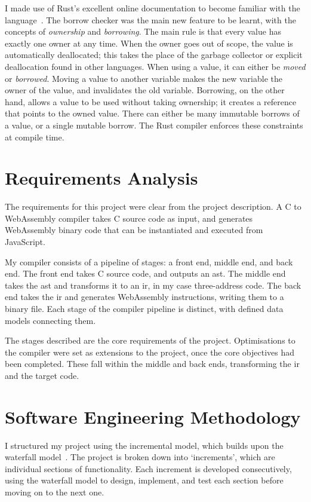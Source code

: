 \documentclass[00-main.tex]{subfiles}
\begin{document}
I made use of Rust's excellent online documentation to become familiar with the language~.
The borrow checker was the main new feature to be learnt, with the concepts of \emph{ownership} and \emph{borrowing}.
The main rule is that every value has exactly one owner at any time.
When the owner goes out of scope, the value is automatically deallocated; this takes the place of the garbage collector or explicit deallocation found in other languages.
When using a value, it can either be \emph{moved} or \emph{borrowed}.
Moving a value to another variable makes the new variable the owner of the value, and invalidates the old variable.
Borrowing, on the other hand, allows a value to be used without taking ownership; it creates a reference that points to the owned value.
There can either be many immutable borrows of a value, or a single mutable borrow.
The Rust compiler enforces these constraints at compile time.

\section{Requirements Analysis}

The requirements for this project were clear from the project description.
A C to WebAssembly compiler takes C source code as input, and generates WebAssembly binary code that can be instantiated and executed from JavaScript.

My compiler consists of a pipeline of stages: a front end, middle end, and back end.
The front end takes C source code, and outputs an \gls{ast}.
The middle end takes the \gls{ast} and transforms it to an \gls{ir}, in my case three-address code.
The back end takes the \gls{ir} and generates WebAssembly instructions, writing them to a binary file.
Each stage of the compiler pipeline is distinct, with defined data models connecting them.

The stages described are the core requirements of the project.
Optimisations to the compiler were set as extensions to the project, once the core objectives had been completed.
These fall within the middle and back ends, transforming the \gls{ir} and the target code.



\section{Software Engineering Methodology}

I structured my project using the incremental model, which builds upon the waterfall model~.
The project is broken down into `increments', which are individual sections of functionality.
Each increment is developed consecutively, using the waterfall model to design, implement, and test each section before moving on to the next one.
\end{document}
